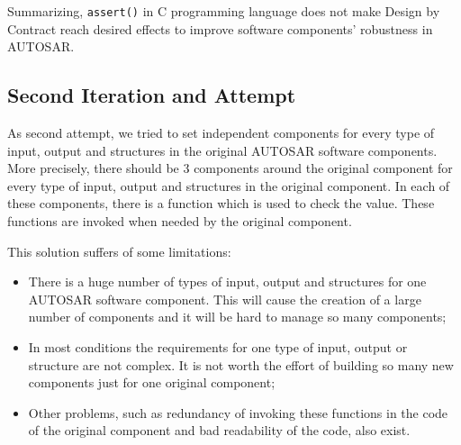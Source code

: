 Summarizing, \texttt{assert()} in C programming language does not make Design by Contract reach desired effects to improve software components' robustness in AUTOSAR.


\subsection{Second Iteration and Attempt}
As second attempt, we tried to set independent components for every type of input, output and structures in the original AUTOSAR software components. %
More precisely, there should be 3 components around the original component for every type of input, output and structures in the original component. In each of these components, there is a function which is used to check the value. %
These functions are invoked when needed by the original component. 

This solution suffers of some limitations: 
\begin{itemize}
\item There is a huge number of types of input, output and structures for one AUTOSAR software component. This will cause the creation of a large number of components and it will be hard to manage so many components;
\item In most conditions the requirements for one type of input, output or structure are not complex. It is not worth the effort of building so many new components just for one original component;
\item Other problems, such as redundancy of invoking these functions in the code of the original component and bad readability of the code, also exist.
\end{itemize}

